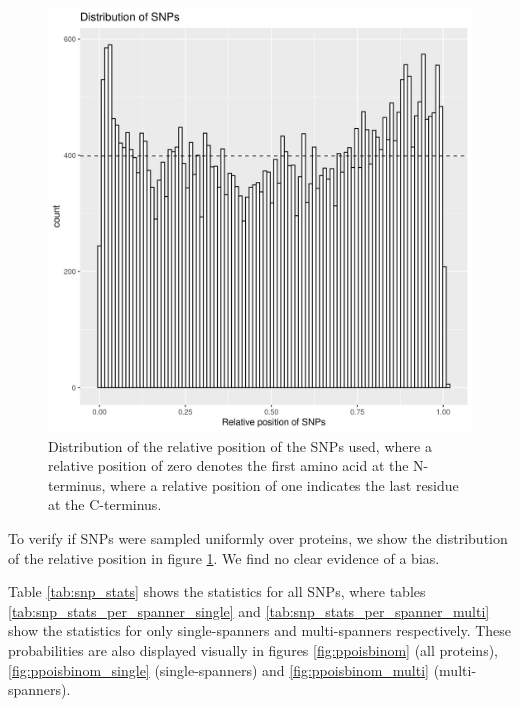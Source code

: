 \begin{figure}[!htbp]
  \includegraphics[width=\textwidth]{ncbi_peregrine_results/fig_snp_rel_pos.png}
  \caption{
    Distribution of the relative position of the SNPs used,
    where a relative position of zero denotes the first amino
    acid at the N-terminus, where a relative position of one
    indicates the last residue at the C-terminus.
  }
  \label{fig:snp_rel_pos}
\end{figure}


To verify if SNPs were sampled uniformly
over proteins, we show the distribution 
of the relative position in figure \ref{fig:snp_rel_pos}.
We find no clear evidence of a bias.


Table \ref{tab:snp_stats} shows the statistics for all
SNPs, where tables \ref{tab:snp_stats_per_spanner_single}
and \ref{tab:snp_stats_per_spanner_multi} show the
statistics for only single-spanners and multi-spanners respectively.
These probabilities are also displayed visually in 
figures \ref{fig:ppoisbinom} (all proteins), \ref{fig:ppoisbinom_single} (single-spanners)
and \ref{fig:ppoisbinom_multi} (multi-spanners).
 
